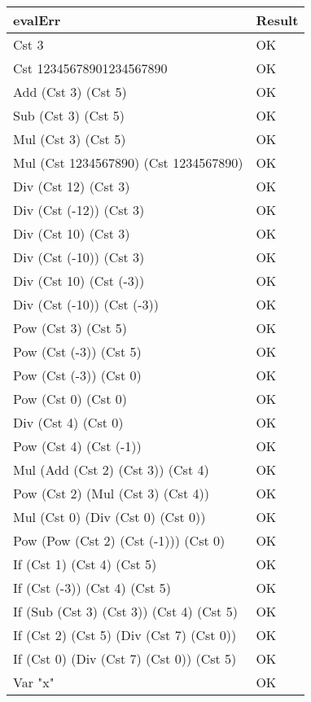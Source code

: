 \documentclass[12pt,a4paper]{article}
\begin{document}
\begin{tabularx}{\linewidth}[!htbp]{X|l}
 \textbf{evalErr} & Result \\
 \hline
	Cst 3 & OK \\
	 \hline
    Cst 12345678901234567890 & OK \\
     \hline
    Add (Cst 3) (Cst 5) & OK \\
     \hline
    Sub (Cst 3) (Cst 5) & OK \\
     \hline
    Mul (Cst 3) (Cst 5) & OK \\
     \hline
    Mul (Cst 1234567890) (Cst 1234567890) & OK \\
     \hline
    Div (Cst 12) (Cst 3) & OK \\
     \hline
    Div (Cst (-12)) (Cst 3) & OK \\
     \hline
    Div (Cst 10) (Cst 3) & OK \\
     \hline
    Div (Cst (-10)) (Cst 3) & OK \\
     \hline
    Div (Cst 10) (Cst (-3)) & OK \\
     \hline
    Div (Cst (-10)) (Cst (-3)) & OK \\
     \hline
    Pow (Cst 3) (Cst 5) & OK \\
     \hline
    Pow (Cst (-3)) (Cst 5) & OK \\
     \hline
    Pow (Cst (-3)) (Cst 0) & OK \\
     \hline
    Pow (Cst 0) (Cst 0) & OK \\
     \hline
    Div (Cst 4) (Cst 0) & OK \\
     \hline
    Pow (Cst 4) (Cst (-1)) & OK \\
     \hline
    Mul (Add (Cst 2) (Cst 3)) (Cst 4) & OK \\
     \hline
    Pow (Cst 2) (Mul (Cst 3) (Cst 4)) & OK \\
     \hline
    Mul (Cst 0) (Div (Cst 0) (Cst 0)) & OK \\
     \hline
    Pow (Pow (Cst 2) (Cst (-1))) (Cst 0) & OK \\
     \hline
    If (Cst 1) (Cst 4) (Cst 5) & OK \\
     \hline
    If (Cst (-3)) (Cst 4) (Cst 5) & OK \\
     \hline
    If (Sub (Cst 3) (Cst 3)) (Cst 4) (Cst 5) & OK \\
     \hline
    If (Cst 2) (Cst 5) (Div (Cst 7) (Cst 0)) & OK \\
     \hline
    If (Cst 0) (Div (Cst 7) (Cst 0)) (Cst 5) & OK \\
     \hline
    Var "x" & OK \\

\end{tabularx}
\end{document}
